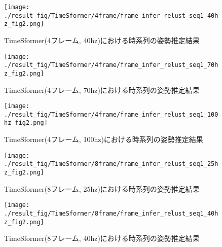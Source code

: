 \begin{figure}[thpb]
  \begin{minipage}[htpb]{1.0\hsize}
  \begin{center}
  \texttt{[image: ./result\_fig/TimeSformer/4frame/frame\_infer\_relust\_seq1\_40hz\_fig2.png]}
  \caption{TimeSformer(4フレーム, 40hz)における時系列の姿勢推定結果}
  \end{center}
  \end{minipage}
\end{figure}

\begin{figure}[thpb]
  \begin{minipage}[htpb]{1.0\hsize}
  \begin{center}
  \texttt{[image: ./result\_fig/TimeSformer/4frame/frame\_infer\_relust\_seq1\_70hz\_fig2.png]}
  \caption{TimeSformer(4フレーム, 70hz)における時系列の姿勢推定結果}
  \end{center}
  \end{minipage}
\end{figure}

\begin{figure}[thpb]
  \begin{minipage}[htpb]{1.0\hsize}
  \begin{center}
  \texttt{[image: ./result\_fig/TimeSformer/4frame/frame\_infer\_relust\_seq1\_100hz\_fig2.png]}
  \caption{TimeSformer(4フレーム, 100hz)における時系列の姿勢推定結果}
  \end{center}
  \end{minipage}
\end{figure}


\begin{figure}[thpb]
  \begin{minipage}[htpb]{1.0\hsize}
  \begin{center}
  \texttt{[image: ./result\_fig/TimeSformer/8frame/frame\_infer\_relust\_seq1\_25hz\_fig2.png]}
  \caption{TimeSformer(8フレーム, 25hz)における時系列の姿勢推定結果}
  \end{center}
  \end{minipage}
\end{figure}

\begin{figure}[thpb]
  \begin{minipage}[htpb]{1.0\hsize}
  \begin{center}
  \texttt{[image: ./result\_fig/TimeSformer/8frame/frame\_infer\_relust\_seq1\_40hz\_fig2.png]}
  \caption{TimeSformer(8フレーム, 40hz)における時系列の姿勢推定結果}
  \end{center}
  \end{minipage}
\end{figure}


